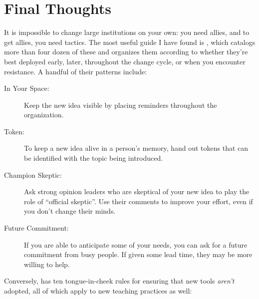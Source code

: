 \section{Final Thoughts}\label{s:partner-final}

It is impossible to change large institutions on your own:
you need allies,
and to get allies,
you need tactics.
The most useful guide I have found is \cite{Mann2015},
which catalogs more than four dozen of these
and organizes them according to whether they're best deployed early,
later,
throughout the change cycle,
or when you encounter resistance.
A handful of their patterns include:

\begin{description}

\item[In Your Space:]
  Keep the new idea visible
  by placing reminders throughout the organization.

\item[Token:]
  To keep a new idea alive in a person's memory,
  hand out tokens that can be identified with the topic being introduced.

\item[Champion Skeptic:]
  Ask strong opinion leaders who are skeptical of your new idea
  to play the role of ``official skeptic''.
  Use their comments to improve your effort,
  even if you don't change their minds.

\item[Future Commitment:]
  If you are able to anticipate some of your needs,
  you can ask for a future commitment from busy people.
  If given some lead time,
  they may be more willing to help.
  
\end{description}

Conversely,
\cite{Farm2006} has ten tongue-in-cheek rules for ensuring that new tools \emph{aren't} adopted,
all of which apply to new teaching practices as well:


